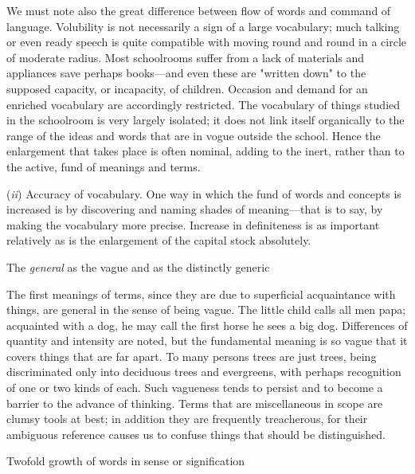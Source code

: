 \documentclass[letterpaper]{book}
\begin{document}
We must note also the great difference between flow of words and command
of language. Volubility is not necessarily a sign of a large vocabulary;
much talking or even ready speech is quite compatible with moving round
and round in a circle of moderate radius. Most schoolrooms suffer from a
lack of materials and appliances save perhaps books---and even these are
"written down" to the supposed capacity, or incapacity, of children.
Occasion and demand for an enriched vocabulary are accordingly
restricted. The vocabulary of things studied in the schoolroom is very
largely isolated; it does not link itself organically to the range of
the ideas and words that are in vogue outside the school. Hence the
enlargement that takes place is often
nominal,
adding to the inert, rather than to the active, fund of meanings and
terms.

(\emph{ii}) Accuracy of vocabulary. One way in which the fund of words
and concepts is increased is by discovering and naming shades of
meaning---that is to say, by making the vocabulary more precise.
Increase in definiteness is as important relatively as is the
enlargement of the capital stock absolutely.

The \emph{general} as the vague and as the distinctly generic

The first meanings of terms, since they are due to superficial
acquaintance with things, are general in the sense of being vague. The
little child calls all men papa; acquainted with a dog, he may call the
first horse he sees a big dog. Differences of quantity and intensity are
noted, but the fundamental meaning is so vague that it covers things
that are far apart. To many persons trees are just trees, being
discriminated only into deciduous trees and evergreens, with perhaps
recognition of one or two kinds of each. Such vagueness tends to persist
and to become a barrier to the advance of thinking. Terms that are
miscellaneous in scope are clumsy tools at best; in addition they are
frequently treacherous, for their ambiguous reference causes us to
confuse things that should be distinguished.

Twofold growth of words in sense or signification
\end{document}
